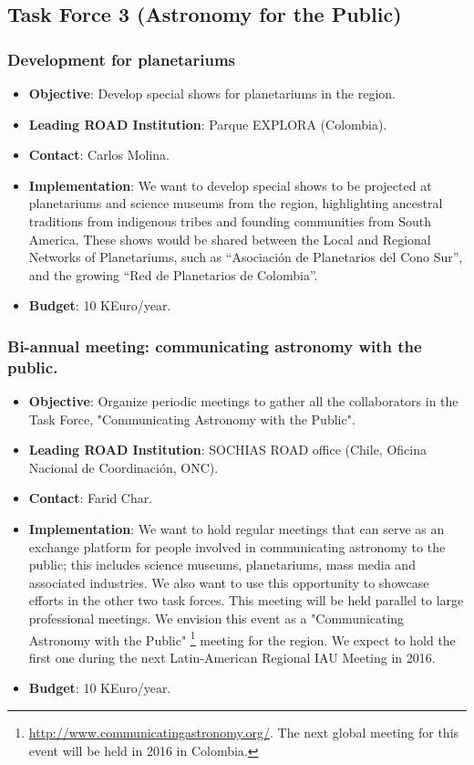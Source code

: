 \documentclass[12pt]{article}
\begin{document}
\subsection{Task Force 3 (Astronomy for the Public)}


\subsubsection{Development for planetariums}
\begin{itemize}
\item {\bf Objective}: Develop special shows for planetariums in the
  region. 
\item {\bf Leading ROAD Institution}: Parque EXPLORA (Colombia).
\item {\bf Contact}: Carlos Molina.
\item {\bf Implementation}: We want to develop special shows to be projected
  at planetariums and science museums from the region, highlighting
  ancestral traditions from indigenous tribes and founding communities
  from South America. These shows would be shared between the Local
  and Regional Networks of Planetariums, such as “Asociación de
  Planetarios del Cono Sur”, and the growing “Red de Planetarios de
  Colombia”.   
\item {\bf Budget}: 10 KEuro/year.
\end{itemize}


\subsubsection{Bi-annual meeting: communicating astronomy with the
  public.}
\begin{itemize}
\item {\bf Objective}: Organize periodic meetings to gather all the
  collaborators in the Task Force, "Communicating Astronomy with the
  Public".  
\item {\bf Leading ROAD Institution}: SOCHIAS ROAD office
 (Chile, Oficina
  Nacional de Coordinaci\'on, ONC).
\item {\bf Contact}: Farid Char.
\item {\bf Implementation}: We want to hold regular meetings that can
  serve as an exchange platform for people involved in communicating
  astronomy to the public; this includes science museums,
  planetariums, mass media and associated industries. We also want to use
  this opportunity to showcase efforts in the other two task
  forces. This meeting will be held parallel to large professional
  meetings. We envision this event as a "Communicating Astronomy
  with the
  Public" \footnote{\url{http://www.communicatingastronomy.org/}. The
    next global meeting for this event will be held in 2016 in Colombia.}
  meeting for the region. We expect to hold the first one during the
  next Latin-American Regional IAU Meeting in 2016.  
\item {\bf Budget}: 10 KEuro/year.
\end{itemize}
\end{document}
